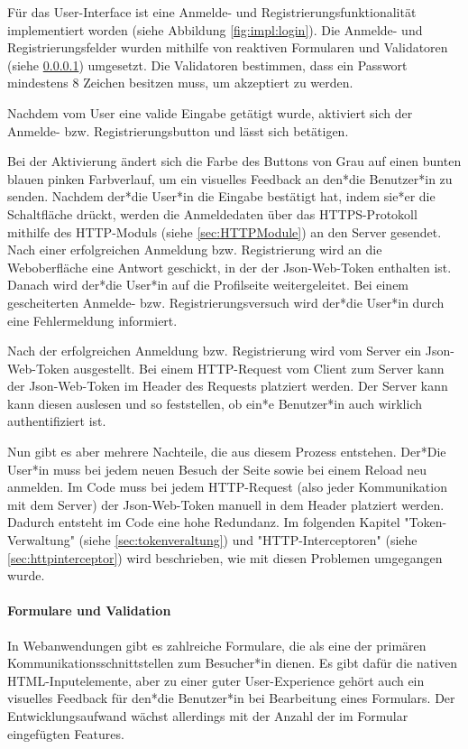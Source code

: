 Für das User-Interface ist eine Anmelde- und Registrierungsfunktionalität implementiert worden (siehe Abbildung \ref{fig:impl:login}). Die Anmelde- und Registrierungsfelder wurden mithilfe von reaktiven Formularen und Validatoren (siehe \ref{par:impl:usermanagment:reactiveForms}) umgesetzt.
Die Validatoren bestimmen, dass ein Passwort mindestens 8 Zeichen besitzen muss, um akzeptiert zu werden.

Nachdem vom User eine valide Eingabe getätigt wurde, aktiviert sich der Anmelde- bzw. Registrierungsbutton und lässt sich betätigen.

Bei der Aktivierung ändert sich die Farbe des Buttons von Grau auf einen bunten blauen pinken Farbverlauf, um ein visuelles Feedback an den*die Benutzer*in zu senden. Nachdem der*die User*in die Eingabe bestätigt hat, indem sie*er die Schaltfläche drückt, werden die Anmeldedaten über das HTTPS-Protokoll mithilfe des HTTP-Moduls (siehe \ref{sec:HTTPModule}) an den Server gesendet. Nach einer erfolgreichen Anmeldung bzw. Registrierung wird an die Weboberfläche eine Antwort geschickt, in der der Json-Web-Token enthalten ist. Danach wird der*die User*in auf die Profilseite weitergeleitet. Bei einem gescheiterten Anmelde- bzw. Registrierungsversuch wird der*die User*in durch eine Fehlermeldung informiert.

Nach der erfolgreichen Anmeldung bzw. Registrierung wird vom Server ein Json-Web-Token ausgestellt. Bei einem HTTP-Request vom Client zum Server kann der Json-Web-Token im Header des Requests platziert werden. Der Server kann kann diesen auslesen und so feststellen, ob ein*e Benutzer*in auch wirklich authentifiziert ist.

Nun gibt es aber mehrere Nachteile, die aus diesem Prozess entstehen. Der*Die User*in muss bei jedem neuen Besuch der Seite sowie bei einem Reload neu anmelden. Im Code muss bei jedem HTTP-Request (also jeder Kommunikation mit dem Server) der Json-Web-Token manuell in dem Header platziert werden. Dadurch entsteht im Code eine hohe Redundanz. Im folgenden Kapitel "Token-Verwaltung" (siehe \ref{sec:tokenveraltung}) und "HTTP-Interceptoren" (siehe \ref{sec:httpinterceptor}) wird beschrieben, wie mit diesen Problemen umgegangen wurde.

\paragraph{Formulare und Validation}
\label{par:impl:usermanagment:reactiveForms}
In Webanwendungen gibt es zahlreiche Formulare, die als eine der primären Kommunikationsschnittstellen zum Besucher*in dienen. Es gibt dafür die nativen HTML-Inputelemente, aber zu einer guter User-Experience gehört auch ein visuelles Feedback für den*die Benutzer*in bei Bearbeitung eines Formulars. Der Entwicklungsaufwand wächst allerdings mit der Anzahl der im Formular eingefügten Features.

